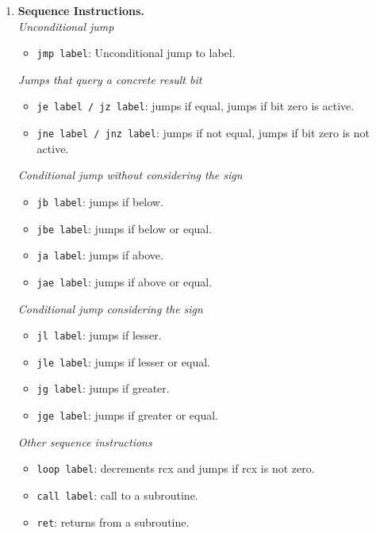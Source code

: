 \begin{enumerate}
\item \textbf{Sequence Instructions.}\\
\textit{Unconditional jump}
	\begin{itemize}
	\item \texttt{jmp label}: Unconditional jump to label.
	\end{itemize}
	
\textit{Jumps that query a concrete result bit}
	\begin{itemize}
	\item \texttt{je label / jz label}: jumps if equal, jumps if bit zero is active.
	\item \texttt{jne label / jnz label}: jumps if not equal, jumps if bit zero is not active.
	\end{itemize}	

\textit{Conditional jump without considering the sign}
	\begin{itemize}
	\item \texttt{jb label}: jumps if below.
	\item \texttt{jbe label}: jumps if below or equal.
	\item \texttt{ja label}: jumps if above.
	\item \texttt{jae label}: jumps if above or equal.
	\end{itemize}	

\textit{Conditional jump considering the sign}
	\begin{itemize}
	\item \texttt{jl label}: jumps if lesser.
	\item \texttt{jle label}: jumps if lesser or equal.
	\item \texttt{jg label}: jumps if greater.
	\item \texttt{jge label}: jumps if greater or equal.
	\end{itemize}	

\textit{Other sequence instructions}
	\begin{itemize}
	\item \texttt{loop label}: decrements rcx and jumps if rcx is not zero.
	\item \texttt{call label}: call to a subroutine.
	\item \texttt{ret}: returns from a subroutine.
	\end{itemize}	
\end{enumerate}
